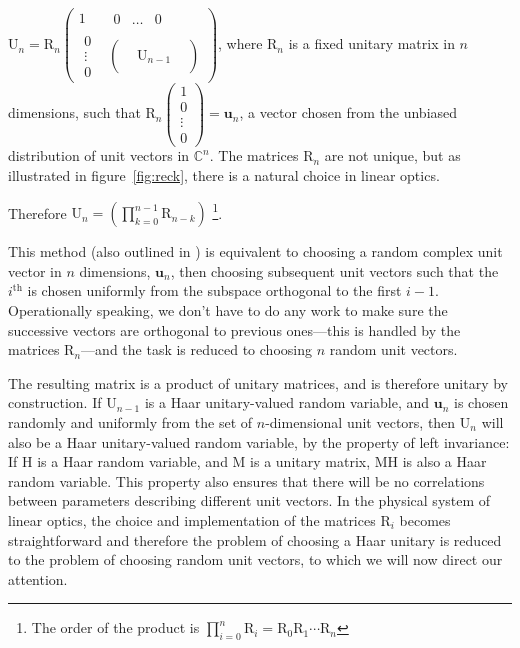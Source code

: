 \documentclass[aps,prl,twocolumn]{revtex4}
\renewcommand{\vec}[1]{\mathbf{#1}}
\newcommand{\mat}[1]{\mathrm{#1}}
\begin{document}
\(\mat{U}_n = \mat{R}_n \begin{pmatrix}
  1 & \begin{matrix}
    0 & \dots & 0 \end{matrix} \\
  \begin{matrix}
    0 \\
    \vdots \\
    0 \end{matrix} &
  \begin{pmatrix}
    & & \\
    & \mat{U}_{n-1} & \\
    & & \end{pmatrix} \end{pmatrix} \),
where \(\mat{R}_{n}\) is a fixed unitary matrix in \(n\) dimensions, such
that \(\mat{R}_n \begin{pmatrix}
  1 \\
  0 \\
  \vdots \\
  0 \end{pmatrix} = \vec{u}_n\), a vector chosen from the unbiased
distribution of unit vectors in \(\mathbb{C}^n\). The matrices \(\mat{R}_n\) are
not unique, but as illustrated in figure~\ref{fig:reck}, there is a natural
choice in linear optics.

Therefore \(\mat{U}_n = \left( \displaystyle\prod_{k=0}^{n-1} \mat{R}_{n-k}
\right)\) \footnote{The order of the product is \( \prod_{i=0}^{n} \mat{R}_i =
\mat{R}_0 \mat{R}_1 \cdots \mat{R}_n \)}.

This method (also outlined in \cite{re-phd}) is equivalent to choosing a random
complex unit vector in \(n\) dimensions, \(\vec{u}_n\), then choosing subsequent
unit vectors such that the \(i^{\text{th}}\) is chosen uniformly from
the subspace orthogonal to the first \(i-1\). Operationally speaking, we don't
have to do any work to make sure the successive vectors are orthogonal to
previous ones---this is handled by the matrices \(\mat{R}_n\)---and the task
is reduced to choosing \(n\) random unit vectors.

The resulting matrix is a product of unitary matrices, and is therefore unitary
by construction. If \(\mat{U}_{n-1}\) is a Haar unitary-valued random variable,
and \(\vec{u}_{n}\) is chosen randomly and uniformly from the set of
\(n\)-dimensional unit vectors, then \(\mat{U}_n\) will also be a Haar
unitary-valued random variable, by the property of left invariance: If
\(\mat{H}\) is a Haar random variable, and \(\mat{M}\) is a unitary
matrix, \(\mat{MH}\) is also a Haar random variable. This property also ensures
that there will be no correlations between parameters describing different
unit vectors. In the physical system of
linear optics, the choice and implementation of the matrices \(\mat{R}_i\)
becomes straightforward \cite{re-prl-73-58} and therefore the problem of
choosing a Haar unitary is reduced to the problem of choosing random unit
vectors, to which we will now direct our attention.

\end{document}
